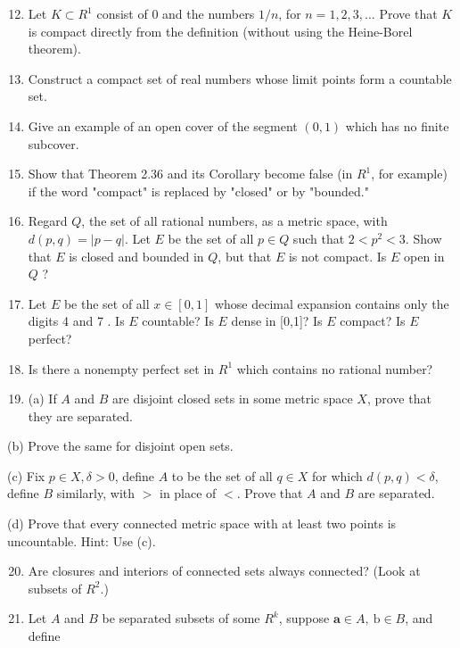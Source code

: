 \documentclass[10pt]{article}
\begin{document}
\begin{enumerate}
  \setcounter{enumi}{11}
  \item Let $K \subset R^{1}$ consist of 0 and the numbers $1 / n$, for $n=1,2,3, \ldots$ Prove that $K$ is compact directly from the definition (without using the Heine-Borel theorem).

  \item Construct a compact set of real numbers whose limit points form a countable set.

  \item Give an example of an open cover of the segment $(0,1)$ which has no finite subcover.

  \item Show that Theorem 2.36 and its Corollary become false (in $R^{1}$, for example) if the word "compact" is replaced by "closed" or by "bounded."

  \item Regard $Q$, the set of all rational numbers, as a metric space, with $d(p, q)=|p-q|$. Let $E$ be the set of all $p \in Q$ such that $2<p^{2}<3$. Show that $E$ is closed and bounded in $Q$, but that $E$ is not compact. Is $E$ open in $Q$ ?

  \item Let $E$ be the set of all $x \in[0,1]$ whose decimal expansion contains only the digits 4 and 7 . Is $E$ countable? Is $E$ dense in [0,1]? Is $E$ compact? Is $E$ perfect?

  \item Is there a nonempty perfect set in $R^{1}$ which contains no rational number?

  \item (a) If $A$ and $B$ are disjoint closed sets in some metric space $X$, prove that they are separated.

\end{enumerate}

(b) Prove the same for disjoint open sets.

(c) Fix $p \in X, \delta>0$, define $A$ to be the set of all $q \in X$ for which $d(p, q)<\delta$, define $B$ similarly, with $>$ in place of $<$. Prove that $A$ and $B$ are separated.

(d) Prove that every connected metric space with at least two points is uncountable. Hint: Use (c).

\begin{enumerate}
  \setcounter{enumi}{19}
  \item Are closures and interiors of connected sets always connected? (Look at subsets of $R^{2}$.)

  \item Let $A$ and $B$ be separated subsets of some $R^{k}$, suppose $\mathbf{a} \in A, \mathrm{~b} \in B$, and define

\end{enumerate}
\end{document}
